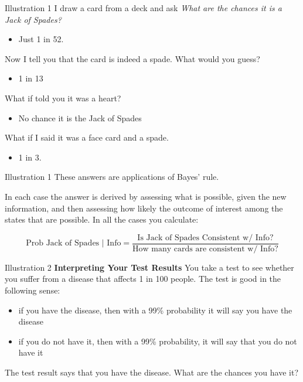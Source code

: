 \documentclass[
  11pt,
  ignorenonframetext,
]{beamer}
\providecommand{\tightlist}{%
  \setlength{\itemsep}{0pt}\setlength{\parskip}{0pt}}\usepackage{longtable,booktabs,array}
\begin{document}
\begin{frame}{Illustration 1}
\protect\hypertarget{illustration-1}{}
I draw a card from a deck and ask \emph{What are the chances it is a
Jack of Spades?}

\begin{itemize}
\tightlist
\item
  Just 1 in 52.
\end{itemize}

Now I tell you that the card is indeed a spade. What would you guess?

\begin{itemize}
\tightlist
\item
  1 in 13
\end{itemize}

What if told you it was a heart?

\begin{itemize}
\tightlist
\item
  No chance it is the Jack of Spades
\end{itemize}

What if I said it was a face card and a spade.

\begin{itemize}
\tightlist
\item
  1 in 3.
\end{itemize}
\end{frame}

\begin{frame}{Illustration 1}
\protect\hypertarget{illustration-1-1}{}
These answers are applications of Bayes' rule.

In each case the answer is derived by assessing what is possible, given
the new information, and then assessing how likely the outcome of
interest among the states that are possible. In all the cases you
calculate:

\[\text{Prob Jack of Spades | Info} = \frac{\text{Is Jack of Spades Consistent w/ Info?}}{\text{How many cards are consistent w/ Info?}} \]
\end{frame}

\begin{frame}{Illustration 2 \textbf{Interpreting Your Test Results}}
\protect\hypertarget{illustration-2-interpreting-your-test-results}{}
You take a test to see whether you suffer from a disease that affects 1
in 100 people. The test is good in the following sense:

\begin{itemize}
\tightlist
\item
  if you have the disease, then with a 99\% probability it will say you
  have the disease
\item
  if you do not have it, then with a 99\% probability, it will say that
  you do not have it
\end{itemize}

The test result says that you have the disease. What are the chances you
have it?
\end{frame}
\end{document}
